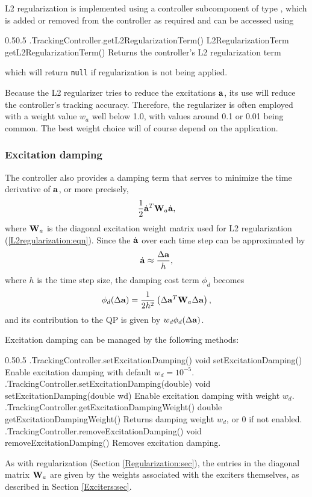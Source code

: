 L2 regularization is implemented using a controller subcomponent of type
, which
is added or removed from the controller as required and can be accessed using
%
\begin{methodtable}{0.5}{0.5}
\midline
%
\methodentry
{\inverse.TrackingController.getL2RegularizationTerm()}%
{L2RegularizationTerm getL2RegularizationTerm()}%
{Returns the controller's L2 regularization term
}%
%
\midline
\end{methodtable}
%
which will return {\tt null} if regularization is not being applied.

Because the L2 regularizer tries to reduce the excitations ${\bf a}$, its use will
reduce the controller's tracking accuracy. Therefore, the regularizer is often
employed with a weight value $w_a$ well below 1.0, with values around 0.1 or
0.01 being common. The best weight choice will of course depend on the
application.

\subsubsection{Excitation damping}
\label{ExcitationDamping:sec}

The controller also provides a damping term that serves to minimize the time
derivative of ${\bf a}$, or more precisely,
%
\begin{equation*}
\frac{1}{2} \dot{{\bf a}}^T {\bf W}_a \dot{{\bf a}},
\end{equation*}
%
where ${\bf W}_a$ is the diagonal excitation weight matrix used for L2
regularization (\ref{L2regularization:eqn}). Since the $\dot{{\bf a}}$
over each time step can be approximated by
%
\begin{equation*}
\dot{{\bf a}} \approx \frac{\Delta {\bf a}}{h},
\end{equation*}
%
where $h$ is the time step size, the damping cost term $\phi_d$
becomes
%
\begin{equation*}
\phi_d(\Delta{\bf a}) = \frac{1}{2 h^2} \left( \Delta{\bf a}^T {\bf W}_a \Delta{\bf a} \right),
\end{equation*}
%
and its contribution to the QP is given by $w_d \phi_d (\Delta{\bf a})$.

Excitation damping can be managed by the following methods:
%
\begin{methodtable}{0.5}{0.5}
\midline
%
\methodentry
{\inverse.TrackingController.setExcitationDamping()}%
{void setExcitationDamping()}%
{Enable excitation damping with default $w_d = 10^{-5}$.}%
%
\methodentry
{\inverse.TrackingController.setExcitationDamping(double)}%
{void setExcitationDamping(double wd)}%
{Enable excitation damping with weight $w_d$.}%
%
\methodentry
{\inverse.TrackingController.getExcitationDampingWeight()}%
{double getExcitationDampingWeight()}%
{Returns damping weight $w_d$, or 0 if not enabled.}%
%
\methodentry
{\inverse.TrackingController.removeExcitationDamping()}%
{void removeExcitationDamping()}%
{Removes excitation damping.}%
%
\midline
\end{methodtable}
%
As with regularization (Section \ref{Regularization:sec}), the entries
in the diagonal matrix ${\bf W}_a$ are given by the weights associated with
the exciters themselves, as described in Section \ref{Exciters:sec}.

